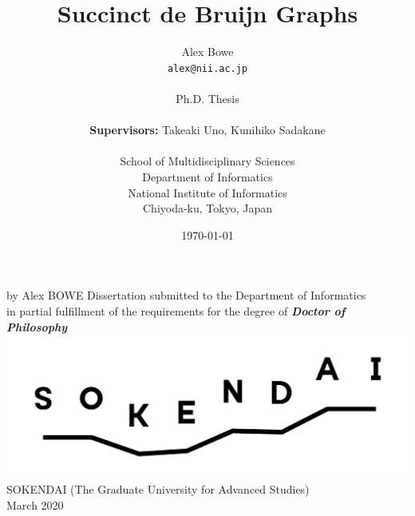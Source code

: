 \documentclass[11pt,a4paper]{report}
\numberwithin{lemma}{chapter}
\numberwithin{theorem}{chapter}
\begin{document}

\newcommand\circrow{\leavevmode\xleaders\hbox{}\hfill\kern0pt}
\circrow
\vskip1.15cm
\circrow
\vskip8mm
\begin{center}
\fontsize{16}{19.2}\selectfont  
by
\vskip4.5mm
Alex BOWE
\vskip1.7cm
Dissertation
\vskip8mm
{\Large
submitted to the Department of Informatics\\[-6pt]
in partial fulfillment of the requirements for the degree of}
\vskip1.5cm
\emph{\bfseries Doctor of Philosophy}
\vskip9mm
\includegraphics[width=.87\textwidth]{sokendai}
\vskip1.1cm
{\Large SOKENDAI (The Graduate University for Advanced Studies)\\[-5pt]
March 2020}
\end{center}  
\restoregeometry
\clearpage


\title{Succinct de Bruijn Graphs}
\author{Alex Bowe\\
\texttt{alex@nii.ac.jp} \\ \\
Ph.D. Thesis\\ \\
\textbf{Supervisors:} Takeaki Uno, Kunihiko Sadakane\\ \\
School of Multidisciplinary Sciences \\
Department of Informatics \\
National Institute of Informatics \\
Chiyoda-ku, Tokyo, Japan}

\date{\today}
\end{document}
